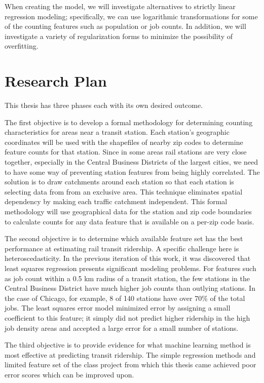 \documentclass{article}
\begin{document}
When creating the model, we will investigate alternatives to strictly linear regression modeling; specifically, we can use logarithmic transformations for some of the counting features such as population or job counts. In addition, we will investigate a variety of regularization forms to minimize the possibility of overfitting. 

\section{Research Plan}

This thesis has three phases each with its own desired outcome.

The first objective is to develop a formal methodology for determining counting characteristics for areas near a transit station. Each station's geographic coordinates will be used with the shapefiles of nearby zip codes to determine feature counts for that station. Since in some areas rail stations are very close together, especially in the Central Business Districts of the largest cities, we need to have some way of preventing station features from being highly correlated. The solution is to draw catchments around each station so that each station is selecting data from from an exclusive area. This technique eliminates spatial dependency by making each traffic catchment independent. This formal methodology will use geographical data for the station and zip code boundaries to calculate counts for any data feature that is available on a per-zip code basis. 

The second objective is to determine which available feature set has the best performance at estimating rail transit ridership. A specific challenge here is heteroscedasticity. In the previous iteration of this work, it was discovered that least squares regression presents significant modeling problems. For features such as job count within a 0.5 km radius of a transit station, the few stations in the Central Business District have much higher job counts than outlying stations. In the case of Chicago, for example, 8 of 140 stations have over 70\% of the total jobs. The least squares error model minimized error by assigning a small coefficient to this feature; it simply did not predict higher ridership in the high job density areas and accepted a large error for a small number of stations. 

The third objective is to provide evidence for what machine learning method is most effective at predicting transit ridership. The simple regression methods and limited feature set of the class project from which this thesis came achieved poor error scores which can be improved upon. 
\end{document}
